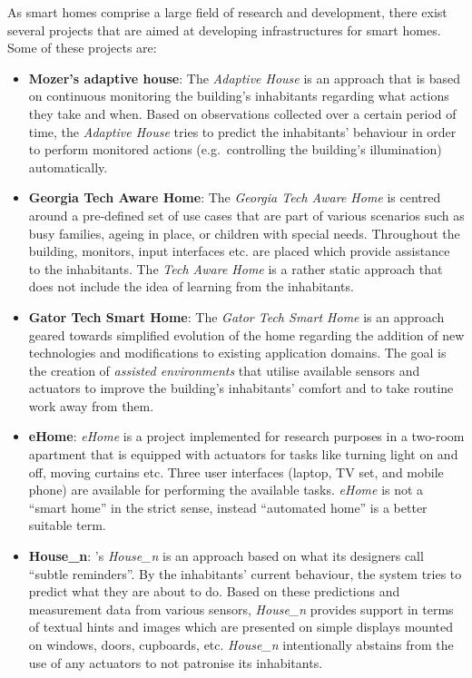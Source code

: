 As smart homes comprise a large field of research and development, there exist several projects that are aimed at developing infrastructures for smart homes. Some of these projects are:
\begin{itemize}
  \item \textbf{Mozer's adaptive house}: The \emph{Adaptive House} is an approach that is based on continuous monitoring the building's inhabitants regarding what actions they take and when. Based on observations collected over a certain period of time, the \emph{Adaptive House} tries to predict the inhabitants' behaviour in order to perform monitored actions (e.g.\ controlling the building's illumination) automatically.~\cite{adaptivehouse}
  
  \item \textbf{Georgia Tech Aware Home}: The \emph{Georgia Tech Aware Home} is centred around a pre-defined set of use cases that are part of various scenarios such as busy families, ageing in place, or children with special needs. Throughout the building, monitors, input interfaces etc. are placed which provide assistance to the inhabitants. The \emph{Tech Aware Home} is a rather static approach that does not include the idea of learning from the inhabitants.~\cite{techawarehome}
  
  \item \textbf{Gator Tech Smart Home}: The \emph{Gator Tech Smart Home} is an approach geared towards simplified evolution of the home regarding the addition of new technologies and modifications to existing application domains. The goal is the creation of \emph{assisted environments} that utilise available sensors and actuators to improve the building's inhabitants' comfort and to take routine work away from them.~\cite{gator_tech}
  
  \item \textbf{eHome}: \emph{eHome} is a project implemented for research purposes in a two-room apartment that is equipped with actuators for tasks like turning light on and off, moving curtains etc. Three user interfaces (laptop, TV set, and mobile phone) are available for performing the available tasks. \emph{eHome} is not a ``smart home'' in the strict sense, instead ``automated home'' is a better suitable term.~\cite{ehome}
  
  \item \textbf{House\_n}: 's \emph{House\_n} is an approach based on what its designers call ``subtle reminders''. By the inhabitants' current behaviour, the system tries to predict what they are about to do. Based on these predictions and measurement data from various sensors, \emph{House\_n} provides support in terms of textual hints and images which are presented on simple displays mounted on windows, doors, cupboards, etc. \emph{House\_n} intentionally abstains from the use of any actuators to not patronise its inhabitants.~\cite{housen}
\end{itemize}

